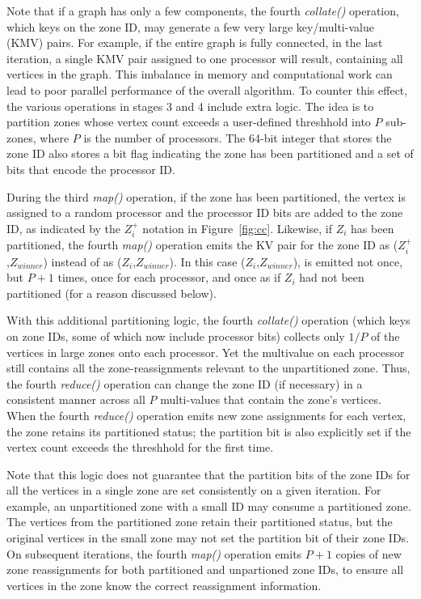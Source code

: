 Note that if a graph has only a few components, the fourth {\it
collate()} operation, which keys on the zone ID, may generate a few
very large key/multi-value (KMV) pairs.  For example, if the entire
graph is fully connected, in the last iteration, a single KMV pair
assigned to one processor will result, containing all vertices in the
graph.  This imbalance in memory and computational work can lead to
poor parallel performance of the overall algorithm.  To counter this
effect, the various operations in stages 3 and 4 include extra logic.
The idea is to partition zones whose vertex count exceeds a
user-defined threshhold into $P$ sub-zones, where $P$ is the number of
processors.  The 64-bit integer that stores the zone ID also stores a
bit flag indicating the zone has been partitioned and a set of bits
that encode the processor ID.

During the third {\it map()} operation, if the zone has been
partitioned, the vertex is assigned to a random processor and the
processor ID bits are added to the zone ID, as indicated by the
$Z_i^+$ notation in Figure~\ref{fig:cc}.  Likewise, if $Z_i$ has been
partitioned, the fourth {\it map()} operation emits the KV pair for
the zone ID as ($Z_i^+$,$Z_{winner}$) instead of as
($Z_i$,$Z_{winner}$).  In this case ($Z_i$,$Z_{winner}$), is emitted
not once, but $P+1$ times, once for each processor, and once as if
$Z_i$ had not been partitioned (for a reason discussed below).

With this additional partitioning logic, the fourth {\it collate()}
operation (which keys on zone IDs, some of which now include processor
bits) collects only $1/P$ of the vertices in large zones onto each
processor.  Yet the multivalue on each processor still contains all
the zone-reassignments relevant to the unpartitioned zone.  Thus, the
fourth {\it reduce()} operation can change the zone ID (if necessary)
in a consistent manner across all $P$ multi-values that contain the
zone's vertices.  When the fourth {\it reduce()} operation emits new
zone assignments for each vertex, the zone retains its partitioned
status; the partition bit is also explicitly set if the vertex count
exceeds the threshhold for the first time.

Note that this logic does not guarantee that the partition bits of the
zone IDs for all the vertices in a single zone are set consistently on
a given iteration.  For example, an unpartitioned zone with a small ID
may consume a partitioned zone.  The vertices from the partitioned
zone retain their partitioned status, but the original vertices in the
small zone may not set the partition bit of their zone IDs.  On
subsequent iterations, the fourth {\it map()} operation emits $P+1$
copies of new zone reassignments for both partitioned and unpartioned
zone IDs, to ensure all vertices in the zone know the correct
reassignment information.

